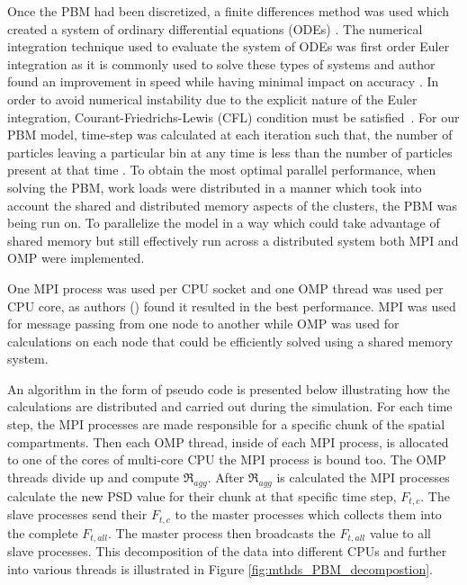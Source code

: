 \documentclass[preprint,11pt,authoryear]{elsarticle}
\begin{document}
Once the PBM had been discretized, a finite differences method was 
used which created a system of ordinary differential equations (ODEs) \citep{Barrasso2015cerd}. The 
numerical integration technique used to evaluate the system of ODEs was first order Euler integration 
as it is commonly used to solve these types of systems and author found an improvement in  speed while 
having minimal impact on accuracy \citep{Barrasso2013}. In order to avoid numerical instability due to the explicit nature of the Euler integration, Courant-Friedrichs-Lewis (CFL) condition must be satisfied~\citep{courant1967}. For our PBM model, time-step was calculated at each iteration such that, the number of particles leaving a particular bin at any time is less than the number of particles present at that time \citep{Ramachandran2010}. To obtain the most optimal parallel 
performance, when solving the PBM, work loads were distributed in a manner which took into account 
the shared and distributed memory aspects of the clusters, the PBM was being run on. To 
parallelize the model in a way which could take advantage of shared memory but still effectively run 
across a distributed system both MPI and OMP were implemented. 

One MPI process was used per CPU socket and one OMP thread was used per CPU core, as 
authors (\cite{Bettencourt2017}) found it resulted in the best performance. MPI was used for message 
passing from one node to another while OMP was used for calculations on each node that could be 
efficiently solved using a shared memory system. 

An algorithm in the form of pseudo code is presented below illustrating how the calculations are distributed and carried out 
during the simulation. For each time step, the MPI processes are made responsible for a specific chunk 
of the spatial compartments. Then each OMP thread, inside of each MPI process, is allocated to one of 
the cores of multi-core CPU the MPI process is bound too. The OMP threads divide up and 
compute $\Re_{agg}$. After $\Re_{agg}$ is calculated the MPI 
processes calculate the new PSD value for their chunk at that specific time step, $F_{t,c}$. The slave 
processes send their $F_{t,c}$ to the master processes which collects them into the complete 
$F_{t,all}$. The master process then broadcasts the $F_{t,all}$ value to all slave processes. This 
decomposition of the data into different CPUs and further into various threads is illustrated in Figure 
\ref{fig:mthds_PBM_decompostion}.	
\end{document}
